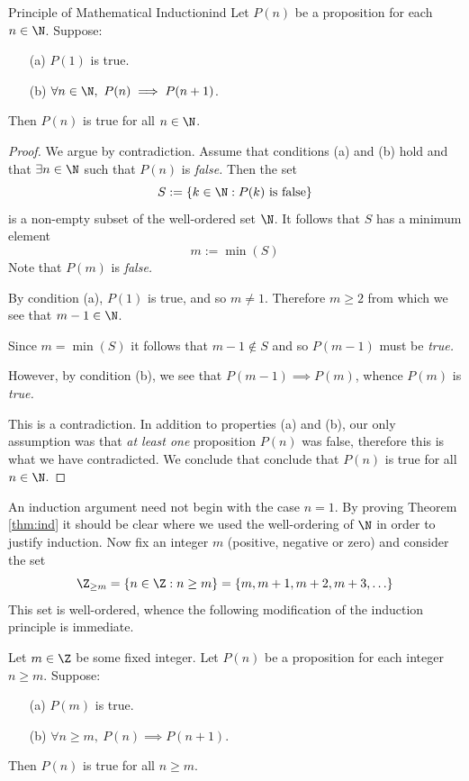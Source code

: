 \begin{thm}{Principle of Mathematical Induction}{ind}
	Let $P(n)$ be a proposition for each $n\in\N$. Suppose:
	\begin{enumerate}
	  \item[(a)] $P(1)$ is true.
	  \item[(b)] $\forall n\in\N,\ P(n)\implies P(n+1)$.
	\end{enumerate}
	Then $P(n)$ is true for all $n\in\N$.
\end{thm}

\begin{proof}
	We argue by contradiction. Assume that conditions (a) and (b) hold and that $\exists n\in\N$ such that $P(n)$ is \emph{false.} Then the set
	\[
		S:=\{k\in\N:P(k)\text{ is false}\}
		\]
	is a non-empty subset of the well-ordered set $\N$. It follows that $S$ has a minimum element
	\[
		m:=\min(S)
	\]
	Note that $P(m)$ is \emph{false.}\par
	By condition (a), $P(1)$ is true, and so $m\neq 1$. Therefore $m\ge 2$ from which we see that $m-1\in\N$.\par
	Since $m=\min(S)$ it follows that $m-1\not\in S$ and so $P(m-1)$ must be \emph{true.}\par
	However, by condition (b), we see that $P(m-1)\implies P(m)$, whence $P(m)$ is \emph{true.}\par
	This is a contradiction. In addition to properties (a) and (b), our only assumption was that \emph{at least one} proposition $P(n)$ was false, therefore this is what we have contradicted. We conclude that conclude that $P(n)$ is true for all $n\in\N$.
\end{proof}


An induction argument need not begin with the case $n=1$. By proving Theorem \ref{thm:ind} it should be clear where we used the well-ordering of $\N$ in order to justify induction. Now fix an integer $m$ (positive, negative or zero) and consider the set
\[
	\Z_{\ge m}=\{n\in\Z:n\ge m\}=\{m,m+1,m+2,m+3,\ldots\}
\]
This set is well-ordered, whence the following modification of the induction principle is immediate.

\begin{cor}{}{}
	Let $m\in\Z$ be some fixed integer. Let $P(n)$ be a proposition for each integer $n\ge m$. Suppose:
	\begin{enumerate}
	  \item[(a)] $P(m)$ is true.
	  \item[(b)] $\forall n\ge m,\ P(n)\implies P(n+1)$.
	\end{enumerate}
	Then $P(n)$ is true for all $n\ge m$.
\end{cor}

